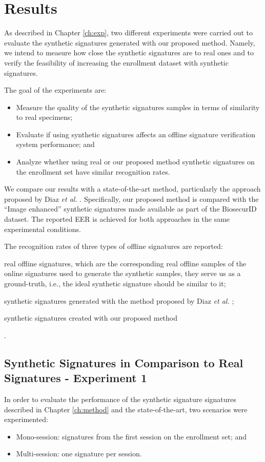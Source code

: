 
\chapter{Results} \label{ch:results}

As described in Chapter \ref{ch:exp}, two different experiments were
carried out to evaluate the synthetic signatures generated with our proposed method. Namely, we intend to measure how close the synthetic signatures are to real ones and to verify the feasibility of increasing the enrollment dataset with synthetic signatures. 

The goal of the experiments are:
\begin{itemize}
	\item Measure the quality of the synthetic signatures samples in terms of similarity to real specimens;
	\item Evaluate if using synthetic signatures affects an offline signature verification system performance; and
	\item Analyze whether using real or our proposed method synthetic signatures on the enrollment set have similar recognition rates.
\end{itemize}

We compare our results with a state-of-the-art method, particularly the approach proposed by Diaz \textit{et al.} \cite{diaz2014generation}. Specifically, our proposed method is compared with the ``Image enhanced'' synthetic signatures made available as part of the BiosecurID \cite{biosecurid} dataset. The reported EER is achieved for both approaches in the same experimental conditions.

The recognition rates of three types of offline signatures are reported: 
\begin{inlinelist}
  \item real offline signatures, which are the corresponding real offline samples of the online signatures used to generate the synthetic samples, they serve us as a ground-truth, i.e., the ideal synthetic signature should be similar to it;
  \item synthetic signatures generated with the method proposed by Diaz \textit{et al.} \cite{diaz2014generation};
  \item synthetic signatures created with our proposed method
\end{inlinelist}.

\section{Synthetic Signatures in Comparison to Real Signatures - Experiment 1}
In order to evaluate the performance of the synthetic signature signatures described in Chapter \ref{ch:method} and the state-of-the-art, two scenarios were experimented: 
\begin{itemize}
\item Mono-session: signatures from the first session on the enrollment set; and
\item Multi-session: one signature per session.
\end{itemize}


